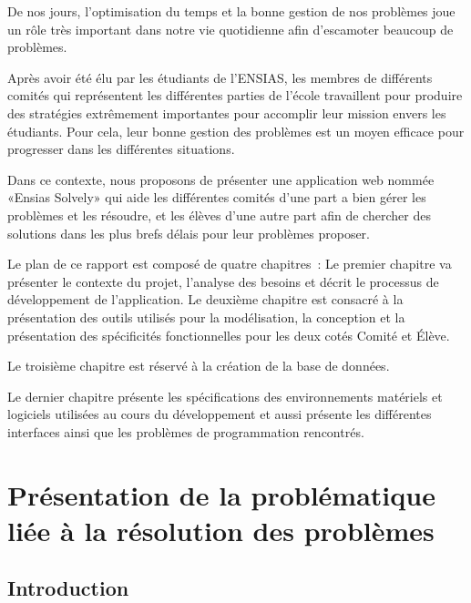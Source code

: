 \documentclass[11.5pt]{report}
\begin{document}
\begin{onehalfspace}
	 De nos jours, l’optimisation du temps et la bonne gestion de nos problèmes joue un rôle très important dans notre vie quotidienne afin d’escamoter beaucoup de problèmes.
	 
	 Après avoir été élu par les étudiants de l’ENSIAS, les membres de différents comités qui représentent les différentes parties de l’école travaillent pour produire des stratégies extrêmement importantes pour accomplir leur mission envers les étudiants. Pour cela, leur bonne gestion des problèmes est un moyen efficace pour progresser dans les différentes situations.
	 
	 Dans ce contexte, nous proposons de présenter une application web nommée «Ensias Solvely» qui aide les différentes comités d’une part a bien gérer les problèmes et les résoudre, et les élèves d’une autre part afin de chercher des solutions dans les plus brefs délais pour leur problèmes proposer.
	 
	 Le plan de ce rapport est composé de quatre chapitres :
	 Le premier chapitre va présenter le contexte du projet, l’analyse des besoins et décrit le processus de développement de l’application.
	 Le deuxième chapitre est consacré à la présentation des outils utilisés pour la modélisation, la conception et la présentation des spécificités fonctionnelles pour les deux cotés Comité et Élève.
	 
	 Le troisième chapitre est réservé à la création de la base de données.
	 
	 Le dernier chapitre présente les spécifications des environnements matériels et logiciels utilisées au cours du développement et aussi présente les différentes interfaces ainsi que les problèmes de programmation rencontrés.
\end{onehalfspace}





\newpage
\onehalfspacing
\chapter{Présentation de la problématique liée à la résolution des problèmes}
\large

\newpage
\section{Introduction}
\end{document}
